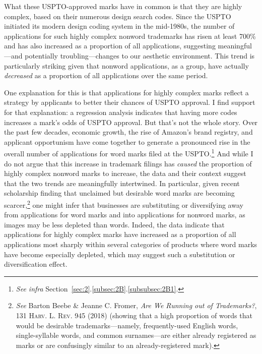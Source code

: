 \documentclass[letterpaper, 11pt, oneside]{article}
\begin{document}
\noindent What these USPTO-approved marks have in common is that they are highly complex, based on their numerous design search codes. Since the USPTO initiated its modern design coding system in the mid-1980s, the number of applications for such highly complex nonword trademarks has risen at least 700\% and has also increased as a proportion of all applications, suggesting meaningful—and potentially troubling—changes to our aesthetic environment. This trend is particularly striking given that nonword applications, as a group, have actually \emph{decreased} as a proportion of all applications over the same period.

One explanation for this is that applications for highly complex marks reflect a strategy by applicants to better their chances of USPTO approval. I find support for that explanation: a regression analysis indicates that having more codes increases a mark's odds of USPTO approval. But that's not the whole story. Over the past few decades, economic growth, the rise of Amazon's brand registry, and applicant opportunism have come together to generate a pronounced rise in the overall number of applications for word marks filed at the USPTO.\footnote{\textit{See infra} Section~\ref{sec:2}.\ref{subsec:2B}.\ref{subsubsec:2B1}.} And while I do not argue that this increase in trademark filings has \emph{caused} the proportion of highly complex nonword marks to increase, the data and their context suggest that the two trends are meaningfully intertwined. In particular, given recent scholarship finding that unclaimed but desirable word marks are becoming scarcer,\footnote{\label{supra4} \textit{See} Barton Beebe \& Jeanne C. Fromer, \textit{Are We Running out of Trademarks?}, 131 \textsc{Harv. L. Rev.} 945 (2018) (showing that a high proportion of words that would be desirable trademarks—namely, frequently-used English words, single-syllable words, and common surnames—are either already registered as marks or are confusingly similar to an already-registered mark).} one might infer that businesses are substituting or diversifying away from applications for word marks and into applications for nonword marks, as images may be less depleted than words. Indeed, the data indicate that applications for highly complex marks have increased as a proportion of all applications most sharply within several categories of products where word marks have become especially depleted, which may suggest such a substitution or diversification effect.
\end{document}
